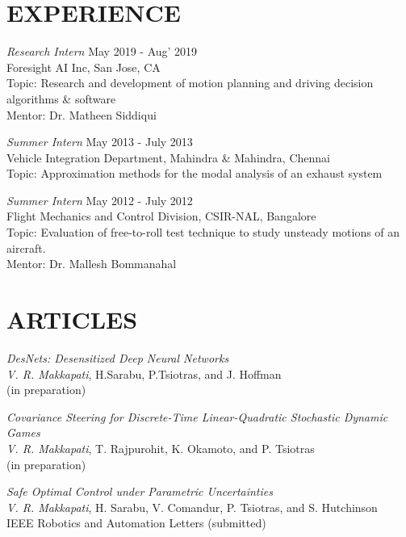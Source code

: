 \documentclass[margin, 10pt]{res} %
\begin{document}
\begin{resume}
\section{EXPERIENCE}

{\sl Research Intern} \hfill May 2019 - Aug' 2019 \\
Foresight AI Inc, San Jose, CA \\
Topic: Research and development of motion planning and driving decision algorithms \& software\\
Mentor: Dr. Matheen Siddiqui

{\sl Summer Intern} \hfill May 2013 - July 2013 \\
Vehicle Integration Department, Mahindra \& Mahindra, Chennai \\
Topic: Approximation methods for the modal analysis of an exhaust system

{\sl Summer Intern} \hfill May 2012 - July 2012 \\
Flight Mechanics and Control Division, CSIR-NAL, Bangalore \\
Topic: Evaluation of free-to-roll test technique to study unsteady motions of an aircraft. \\
Mentor: Dr. Mallesh Bommanahal


\section{ARTICLES} 

{\sl DesNets: Desensitized Deep Neural Networks}\\
\textit{V. R. Makkapati}, H.Sarabu, P.Tsiotras, and J. Hoffman \\
(in preparation)

{\sl Covariance Steering for Discrete-Time Linear-Quadratic Stochastic Dynamic Games}\\
\textit{V. R. Makkapati}, T. Rajpurohit, K. Okamoto, and P. Tsiotras \\
(in preparation)

{\sl Safe Optimal Control under Parametric Uncertainties}\\
\textit{V. R. Makkapati}, H. Sarabu, V. Comandur, P. Tsiotras, and S. Hutchinson \\
IEEE Robotics and Automation Letters (submitted)



\end{resume}
\end{document}
